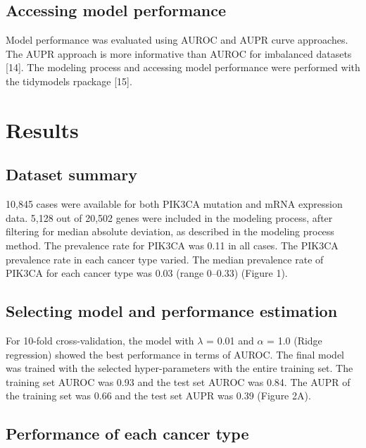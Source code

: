 \documentclass[10pt,letterpaper]{article}
\begin{document}
\hypertarget{accessing-model-performance}{%
\subsection{Accessing model
performance}\label{accessing-model-performance}}

Model performance was evaluated using AUROC and AUPR curve approaches.
The AUPR approach is more informative than AUROC for imbalanced datasets
{[}14{]}. The modeling process and accessing model performance were
performed with the tidymodels rpackage {[}15{]}.

\hypertarget{results}{%
\section{Results}\label{results}}

\hypertarget{dataset-summary}{%
\subsection{Dataset summary}\label{dataset-summary}}

10,845 cases were available for both PIK3CA mutation and mRNA expression
data. 5,128 out of 20,502 genes were included in the modeling process,
after filtering for median absolute deviation, as described in the
modeling process method. The prevalence rate for PIK3CA was 0.11 in all
cases. The PIK3CA prevalence rate in each cancer type varied. The median
prevalence rate of PIK3CA for each cancer type was 0.03 (range 0--0.33)
(Figure 1).

\hypertarget{selecting-model-and-performance-estimation}{%
\subsection{Selecting model and performance
estimation}\label{selecting-model-and-performance-estimation}}

For 10-fold cross-validation, the model with \(\lambda\) = 0.01 and
\(\alpha\) = 1.0 (Ridge regression) showed the best performance in terms
of AUROC. The final model was trained with the selected hyper-parameters
with the entire training set. The training set AUROC was 0.93 and the
test set AUROC was 0.84. The AUPR of the training set was 0.66 and the
test set AUPR was 0.39 (Figure 2A).

\hypertarget{performance-of-each-cancer-type}{%
\subsection{Performance of each cancer
type}\label{performance-of-each-cancer-type}}
\end{document}
